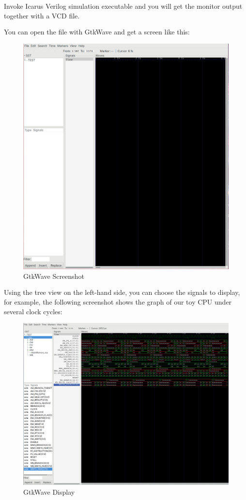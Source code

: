 \documentclass[a4paper,12pt, oneside]{book}
\begin{document}
Invoke Icarus Verilog simulation executable and you will get the monitor output together with a VCD file.

You can open the file with GtkWave and get a screen like this:
\begin{figure}[H]
	\centering
	\includegraphics[scale=0.18]{gtkwave0}
	\caption{GtkWave Screenshot}
\end{figure}

Using the tree view on the left-hand side, you can choose the signals to display, for example, the following screenshot shows the graph of our toy CPU under several clock cycles:

\begin{figure}[H]
	\centering
	\includegraphics[width=\linewidth]{gtkwave1}
	\caption{GtkWave Display}
\end{figure}
\end{document}

